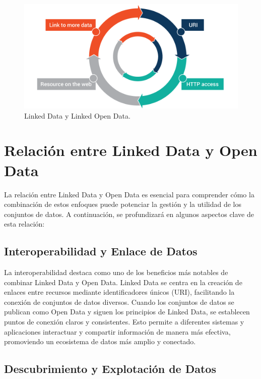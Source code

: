 \documentclass[11pt]{report}
\begin{document}
		\begin{figure}[H]
			\centering
			\includegraphics[scale=0.2]{../img/What-are-Linked-Data-and-Linked-Open-Data.png}
			\caption{Linked Data y Linked Open Data.}
			\label{fig:LOD}
		\end{figure}


		\chapter{Relación entre Linked Data y Open Data}

		La relación entre Linked Data y Open Data es esencial para comprender cómo la combinación de estos enfoques puede potenciar la gestión y la utilidad de los conjuntos de datos. A continuación, se profundizará en algunos aspectos clave de esta relación:
		
		\section{Interoperabilidad y Enlace de Datos}
		
		La interoperabilidad destaca como uno de los beneficios más notables de combinar Linked Data y Open Data. Linked Data se centra en la creación de enlaces entre recursos mediante identificadores únicos (URI), facilitando la conexión de conjuntos de datos diversos. Cuando los conjuntos de datos se publican como Open Data y siguen los principios de Linked Data, se establecen puntos de conexión claros y consistentes. Esto permite a diferentes sistemas y aplicaciones interactuar y compartir información de manera más efectiva, promoviendo un ecosistema de datos más amplio y conectado.
		
		\section{Descubrimiento y Explotación de Datos}
		
\end{document}
